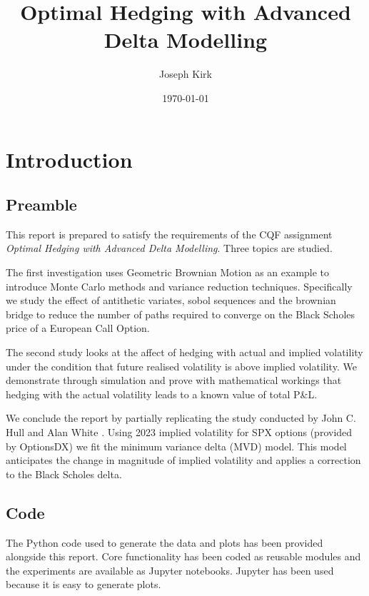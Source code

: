 \documentclass{article}
\newcommand{\para}{\vspace{8pt}} %
\begin{document}
\title{Optimal Hedging with Advanced Delta Modelling }
\author{Joseph Kirk}
\date{\today}

\maketitle

\newpage
\tableofcontents

\newpage
\section{Introduction}

\subsection{Preamble}
This report is prepared to satisfy the requirements of the CQF assignment \textit{Optimal Hedging with Advanced Delta Modelling}. Three topics are studied.

\para
The first investigation uses Geometric Brownian Motion as an example to introduce Monte Carlo methods and variance reduction techniques. 
Specifically we study the effect of antithetic variates, sobol sequences and the brownian bridge to reduce the number of paths required to converge on the Black Scholes 
price of a European Call Option.

\para
The second study looks at the affect of hedging with actual and implied volatility under the condition that future realised volatility is
above implied volatility.  We demonstrate through simulation and prove with mathematical workings that hedging with the actual volatility leads to a known value of total 
P\&L.  

\para
We conclude the report by partially replicating the study conducted by John C. Hull and Alan White \cite{hull}. Using 2023 implied volatility for SPX options (provided by OptionsDX)
we fit the minimum variance delta (MVD) model. This model anticipates the change in magnitude of implied volatility and applies a correction to the Black Scholes delta.

\subsection{Code}

The Python code used to generate the data and plots has been provided alongside this report. Core functionality has been coded as reusable modules and the experiments
are available as Jupyter notebooks. Jupyter has been used because it is easy to generate plots.
\end{document}
